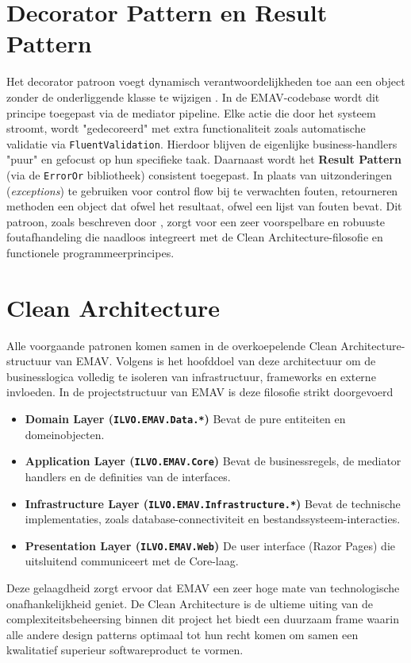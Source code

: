 \section{Decorator Pattern en Result Pattern}
Het decorator patroon voegt dynamisch verantwoordelijkheden toe aan een object zonder de onderliggende klasse te wijzigen \autocite{gof1994}. 
In de EMAV-codebase wordt dit principe toegepast via de mediator pipeline. 
Elke actie die door het systeem stroomt, wordt "gedecoreerd" met extra functionaliteit zoals automatische validatie via \texttt{FluentValidation}. 
Hierdoor blijven de eigenlijke business-handlers "puur" en gefocust op hun specifieke taak.
Daarnaast wordt het \textbf{Result Pattern} (via de \texttt{ErrorOr} bibliotheek) consistent toegepast. 
In plaats van uitzonderingen (\textit{exceptions}) te gebruiken voor control flow bij te verwachten fouten, retourneren methoden een object dat ofwel het resultaat, ofwel een lijst van fouten bevat. 
Dit patroon, zoals beschreven door \textcite{khorikovResultPattern}, zorgt voor een zeer voorspelbare en robuuste foutafhandeling die naadloos integreert met de Clean Architecture-filosofie en functionele programmeerprincipes.
\section{Clean Architecture}
Alle voorgaande patronen komen samen in de overkoepelende Clean Architecture-structuur van EMAV. 
Volgens \textcite{martin2017clean} is het hoofddoel van deze architectuur om de businesslogica volledig te isoleren van infrastructuur, frameworks en externe invloeden. 
In de projectstructuur van EMAV is deze filosofie strikt doorgevoerd\:
\begin{itemize}
    \item \textbf{Domain Layer (\texttt{ILVO.EMAV.Data.*})\:} Bevat de pure entiteiten en domeinobjecten.
    \item \textbf{Application Layer (\texttt{ILVO.EMAV.Core})\:} Bevat de businessregels, de mediator handlers en de definities van de interfaces.
    \item \textbf{Infrastructure Layer (\texttt{ILVO.EMAV.Infrastructure.*})\:} Bevat de technische implementaties, zoals database-connectiviteit en bestandssysteem-interacties.
    \item \textbf{Presentation Layer (\texttt{ILVO.EMAV.Web})\:} De user interface (Razor Pages) die uitsluitend communiceert met de Core-laag.
\end{itemize}
Deze gelaagdheid zorgt ervoor dat EMAV een zeer hoge mate van technologische onafhankelijkheid geniet. De Clean Architecture is de ultieme uiting van de complexiteitsbeheersing binnen dit project\: het biedt een duurzaam frame waarin alle andere design patterns optimaal tot hun recht komen om samen een kwalitatief superieur softwareproduct te vormen.
